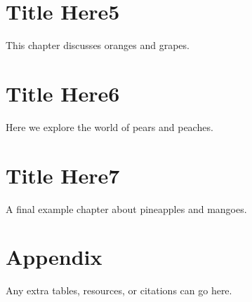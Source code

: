 \documentclass[10pt]{book}
\begin{document}
\chapter{Title Here5}
This chapter discusses oranges and grapes.

\lipsum[2]

\chapter{Title Here6}
Here we explore the world of pears and peaches.

\lipsum[3]

\chapter{Title Here7}
A final example chapter about pineapples and mangoes.

\lipsum[4]















\backmatter

\chapter{Appendix}
Any extra tables, resources, or citations can go here.

\lipsum[1]  %








\printindex
\end{document}
